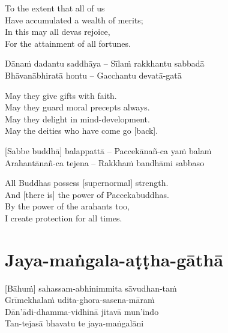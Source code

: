\begin{english-verses}
  To the extent that all of us\\
  Have accumulated a wealth of merits;\\
  In this may all devas rejoice,\\
  For the attainment of all fortunes.
\end{english-verses}

Dānaṁ dadantu saddhāya – Sīlaṁ rakkhantu sabbadā\\
Bhāvanābhiratā hontu – Gacchantu devatā-gatā

\begin{english-verses}
  May they give gifts with faith.\\
  May they guard moral precepts always.\\
  May they delight in mind-development.\\
  May the deities who have come go [back].
\end{english-verses}

[Sabbe buddhā] balappattā – Paccekānañ-ca yaṁ balaṁ\\
Arahantānañ-ca tejena – Rakkhaṁ bandhāmi sabbaso

\begin{english-verses}
  All Buddhas possess [supernormal] strength.\\
  And [there is] the power of Paccekabuddhas.\\
  By the power of the arahants too,\\
  I create protection for all times.
\end{english-verses}

\suttaRef{[MJG]}

\section{Jaya-maṅgala-aṭṭha-gāthā}
\label{jaya-mangala-attha-gatha}

\vspace{-0.6em}

[Bāhuṁ] sahassam-abhinimmita sāvudhan-taṁ\\
Grīmekhalaṁ udita-ghora-sasena-māraṁ\\
Dān'ādi-dhamma-vidhinā jitavā\hyperlink{endnote126-appendix}{\hypertarget{endnote126-body}{}}
mun'indo\\
Tan-tejasā bhavatu te jaya-maṅgalāni

